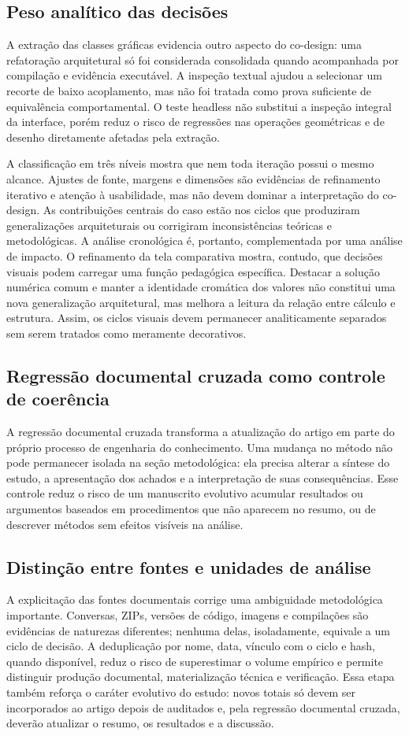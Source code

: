 \documentclass[preprint,12pt,authoryear]{elsarticle}
\begin{document}
\subsection{Peso analítico das decisões}
A extração das classes gráficas evidencia outro aspecto do co-design: uma refatoração arquitetural só foi considerada consolidada quando acompanhada por compilação e evidência executável. A inspeção textual ajudou a selecionar um recorte de baixo acoplamento, mas não foi tratada como prova suficiente de equivalência comportamental. O teste headless não substitui a inspeção integral da interface, porém reduz o risco de regressões nas operações geométricas e de desenho diretamente afetadas pela extração.

A classificação em três níveis mostra que nem toda iteração possui o mesmo alcance. Ajustes de fonte, margens e dimensões são evidências de refinamento iterativo e atenção à usabilidade, mas não devem dominar a interpretação do co-design. As contribuições centrais do caso estão nos ciclos que produziram generalizações arquiteturais ou corrigiram inconsistências teóricas e metodológicas. A análise cronológica é, portanto, complementada por uma análise de impacto.
O refinamento da tela comparativa mostra, contudo, que decisões visuais podem carregar uma função pedagógica específica. Destacar a solução numérica comum e manter a identidade cromática dos valores não constitui uma nova generalização arquitetural, mas melhora a leitura da relação entre cálculo e estrutura. Assim, os ciclos visuais devem permanecer analiticamente separados sem serem tratados como meramente decorativos.

\subsection{Regressão documental cruzada como controle de coerência}
A regressão documental cruzada transforma a atualização do artigo em parte do próprio processo de engenharia do conhecimento. Uma mudança no método não pode permanecer isolada na seção metodológica: ela precisa alterar a síntese do estudo, a apresentação dos achados e a interpretação de suas consequências. Esse controle reduz o risco de um manuscrito evolutivo acumular resultados ou argumentos baseados em procedimentos que não aparecem no resumo, ou de descrever métodos sem efeitos visíveis na análise.

\subsection{Distinção entre fontes e unidades de análise}
A explicitação das fontes documentais corrige uma ambiguidade metodológica importante. Conversas, ZIPs, versões de código, imagens e compilações são evidências de naturezas diferentes; nenhuma delas, isoladamente, equivale a um ciclo de decisão. A deduplicação por nome, data, vínculo com o ciclo e hash, quando disponível, reduz o risco de superestimar o volume empírico e permite distinguir produção documental, materialização técnica e verificação. Essa etapa também reforça o caráter evolutivo do estudo: novos totais só devem ser incorporados ao artigo depois de auditados e, pela regressão documental cruzada, deverão atualizar o resumo, os resultados e a discussão.
\end{document}
